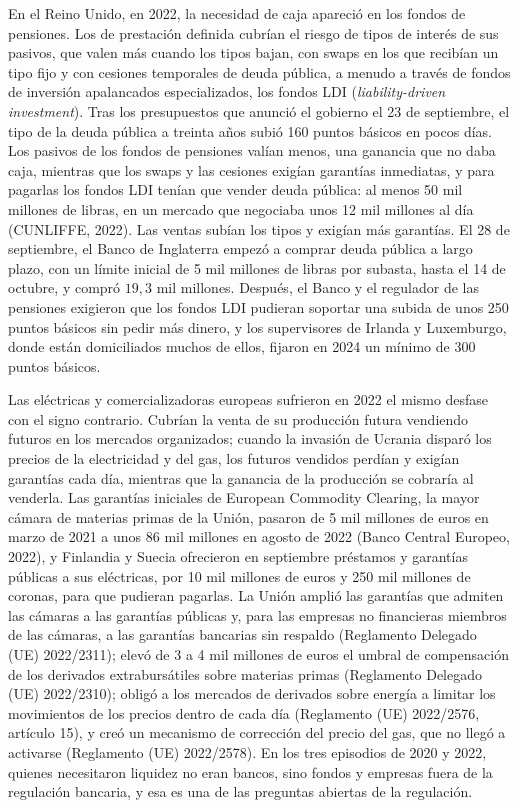 \documentclass[10pt,a4paper]{article}
\begin{document}
En el Reino Unido, en 2022, la necesidad de caja apareció en los fondos de pensiones. Los de prestación definida cubrían el riesgo de tipos de interés de sus pasivos, que valen más cuando los tipos bajan, con swaps en los que recibían un tipo fijo y con cesiones temporales de deuda pública, a menudo a través de fondos de inversión apalancados especializados, los fondos LDI (\textit{liability-driven investment}). Tras los presupuestos que anunció el gobierno el 23 de septiembre, el tipo de la deuda pública a treinta años subió 160 puntos básicos en pocos días. Los pasivos de los fondos de pensiones valían menos, una ganancia que no daba caja, mientras que los swaps y las cesiones exigían garantías inmediatas, y para pagarlas los fondos LDI tenían que vender deuda pública: al menos 50 mil millones de libras, en un mercado que negociaba unos 12 mil millones al día (CUNLIFFE, 2022). Las ventas subían los tipos y exigían más garantías. El 28 de septiembre, el Banco de Inglaterra empezó a comprar deuda pública a largo plazo, con un límite inicial de 5 mil millones de libras por subasta, hasta el 14 de octubre, y compró $19{,}3$ mil millones. Después, el Banco y el regulador de las pensiones exigieron que los fondos LDI pudieran soportar una subida de unos 250 puntos básicos sin pedir más dinero, y los supervisores de Irlanda y Luxemburgo, donde están domiciliados muchos de ellos, fijaron en 2024 un mínimo de 300 puntos básicos.

Las eléctricas y comercializadoras europeas sufrieron en 2022 el mismo desfase con el signo contrario. Cubrían la venta de su producción futura vendiendo futuros en los mercados organizados; cuando la invasión de Ucrania disparó los precios de la electricidad y del gas, los futuros vendidos perdían y exigían garantías cada día, mientras que la ganancia de la producción se cobraría al venderla. Las garantías iniciales de European Commodity Clearing, la mayor cámara de materias primas de la Unión, pasaron de 5 mil millones de euros en marzo de 2021 a unos 86 mil millones en agosto de 2022 (Banco Central Europeo, 2022), y Finlandia y Suecia ofrecieron en septiembre préstamos y garantías públicas a sus eléctricas, por 10 mil millones de euros y 250 mil millones de coronas, para que pudieran pagarlas. La Unión amplió las garantías que admiten las cámaras a las garantías públicas y, para las empresas no financieras miembros de las cámaras, a las garantías bancarias sin respaldo (Reglamento Delegado (UE) 2022/2311); elevó de 3 a 4 mil millones de euros el umbral de compensación de los derivados extrabursátiles sobre materias primas (Reglamento Delegado (UE) 2022/2310); obligó a los mercados de derivados sobre energía a limitar los movimientos de los precios dentro de cada día (Reglamento (UE) 2022/2576, artículo 15), y creó un mecanismo de corrección del precio del gas, que no llegó a activarse (Reglamento (UE) 2022/2578). En los tres episodios de 2020 y 2022, quienes necesitaron liquidez no eran bancos, sino fondos y empresas fuera de la regulación bancaria, y esa es una de las preguntas abiertas de la regulación.
\end{document}
